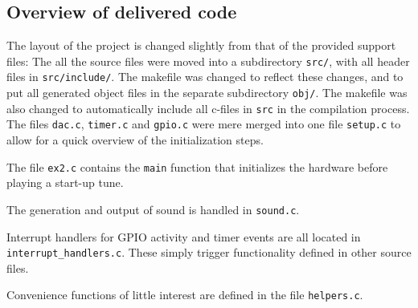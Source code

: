 \subsection{Overview of delivered code}
The layout of the project is changed slightly from that of the provided support files:
The all the source files were moved into a subdirectory \texttt{src/}, with all header files in \texttt{src/include/}.
The makefile was changed to reflect these changes, and to put all generated object files in the separate subdirectory \texttt{obj/}.
The makefile was also changed to automatically include all c-files in \texttt{src} in the compilation process.
The files \texttt{dac.c}, \texttt{timer.c} and \texttt{gpio.c} were mere merged into one file \texttt{setup.c} to allow for a quick overview of the initialization steps.

The file \texttt{ex2.c} contains the \texttt{main} function that initializes the hardware before playing a start-up tune.

The generation and output of sound is handled in \texttt{sound.c}.

Interrupt handlers for GPIO activity and timer events are all located in \texttt{interrupt\_handlers.c}.
These simply trigger functionality defined in other source files.

Convenience functions of little interest are defined in the file \texttt{helpers.c}.
